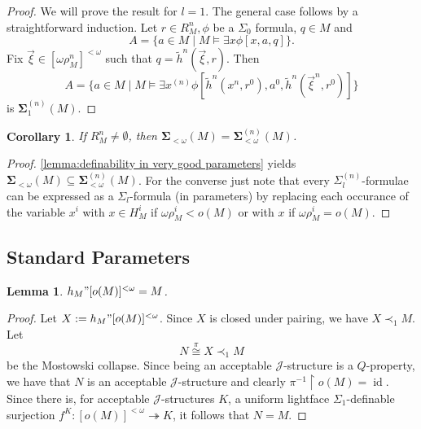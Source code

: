 \documentclass[12pt,a4paper]{article}
\theoremstyle{nicestyle}
\newtheorem{lemma}{Lemma}[subsection]
\newtheorem{corollary}{Corollary}[subsection]
\DeclareMathOperator{\id}{id}
\begin{document}
\begin{proof}
  We will prove the result for $l = 1$. The general case follows by a
  straightforward induction. Let $r \in R^{n}_{M}, \phi$ be a
  $\Sigma_{0}$ formula, $q \in M$ and
  \[
    A = \{ a \in M \mid M \models \exists x \phi[x,a,q] \}.
  \]
  Fix $\vec{\xi} \in [\omega \rho^{n}_{M}]^{<\omega}$ such that
  $q = \tilde{h}^{n}(\vec{\xi}, r)$. Then
  \[
    A = \{ a \in M \mid M \models \exists x^{(n)} \phi [
    \tilde{h}^{n}(x^{n}, r^{0}), a^{0}, \tilde{h}^{n}(\vec{\xi}^{n},
    r^{0})] \}
  \]
  is $\boldsymbol{\Sigma}^{(n)}_{1}(M)$.
\end{proof}

\begin{corollary}
  If $R^{n}_{M} \neq \emptyset$, then
  $\boldsymbol{\Sigma}_{< \omega}(M) = \boldsymbol{\Sigma}^{(n)}_{<
    \omega}(M)$.
\end{corollary}

\begin{proof}
  \autoref{lemma:definability in very good parameters} yields
  $\boldsymbol{\Sigma}_{< \omega}(M) \subseteq
  \boldsymbol{\Sigma}^{(n)}_{< \omega}(M)$. For the converse just note
  that every $\Sigma^{(n)}_{l}$-formulae can be expressed as a
  $\Sigma_{l}$-formula (in parameters) by replacing each occurance of
  the variable $x^{i}$ with $x \in H^{i}_{M}$ if
  $\omega\rho^{i}_{M} < o(M)$ or with $x$ if
  $\omega \rho^{i}_{M} = o(M)$.
\end{proof}

\subsection{Standard Parameters}

\begin{lemma}
  $h_{M}" [o(M)]^{< \omega} = M$.
\end{lemma}

\begin{proof}
  Let $X := h_{M}" [o(M)]^{<\omega}$. Since $X$ is closed under
  pairing, we have $X \prec_{1} M$. Let
  \[
    N \overset{\pi}{\cong} X \prec_{1} M
  \]
  be the Mostowski collapse. Since being an acceptable
  $\mathcal{J}$-structure is a $Q$-property, we have that $N$ is an
  acceptable $\mathcal{J}$-structure and clearly
  $\pi^{-1} \restriction o(M) = \id$. Since there is, for acceptable
  $\mathcal{J}$-structures $K$, a uniform lightface
  $\Sigma_{1}$-definable surjection
  $f^{K} \colon [o(M)]^{<\omega} \twoheadrightarrow K$, it follows
  that $N = M$.
\end{proof}
\end{document}
